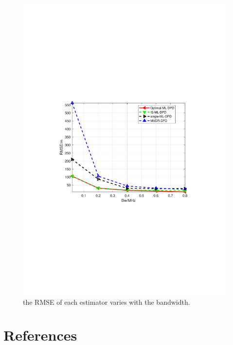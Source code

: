\documentclass[review]{elsarticle}
\begin{document}
\begin{figure}[!t]
    \centerline{\includegraphics[width=1\textwidth]{pdfFigures/BWvsRMSE(snr5dBL10).pdf}}
    \centering
	\caption{the RMSE of each estimator varies with the bandwidth.}\label{fig6}
\end{figure}

\section*{References}

\end{document}

